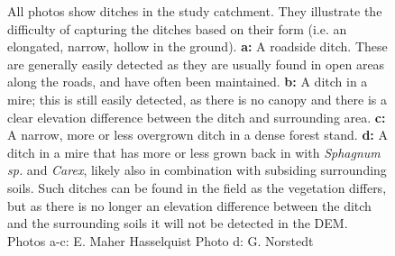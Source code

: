 \documentclass[11pt, review]{elsarticle} %
\providecommand{\DIFaddtex}[1]{{\protect\color{blue}\uwave{#1}}} %
\providecommand{\DIFaddFL}[1]{\DIFadd{#1}} %
\providecommand{\DIFaddendFL}{} %
\providecommand{\DIFadd}[1]{\texorpdfstring{\DIFaddtex{#1}}{#1}} %
\begin{document}
\begin{figure} [!htb]
    \newline \DIFaddFL{c}{
        }\DIFaddFL{\hspace{7pt}
    d}{
        }
    \DIFaddendFL \caption{All photos show ditches in the study catchment. They illustrate the difficulty of capturing the ditches based on their form (i.e. an elongated, narrow, hollow in the ground). \textbf{a: }A roadside ditch. These are generally easily detected as they are usually found in open areas along the roads, and have often been maintained. \textbf{b: }A ditch in a mire; this is still easily detected, as there is no canopy and there is a clear elevation difference between the ditch and surrounding area. \textbf{c: }A narrow, more or less  overgrown ditch in a dense forest stand. \textbf{d: }A ditch in a mire that has more or less grown back in with \textit{Sphagnum sp.} and \textit{Carex}, likely also in combination with subsiding surrounding soils. Such ditches can be found in the field as the vegetation differs, but as there is no longer an elevation difference between the ditch and the surrounding soils it will not be detected in the DEM. Photos a-c: E. Maher Hasselquist  Photo d: G. Norstedt}
    \label{fig:ditchpictures}
\end{figure}
\end{document}
